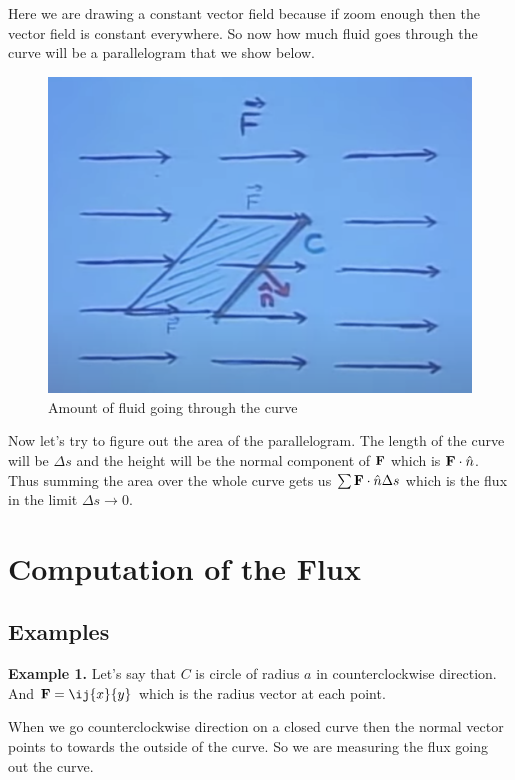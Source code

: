 Here we are drawing a constant vector field because if zoom enough then the vector field is constant everywhere.
So now how much fluid goes through the curve will be a parallelogram that we show below.

\begin{figure}[ht!]
    \centering
    \includegraphics[scale=0.3]{./images/lecture_19_figure_2.png}
    \caption{Amount of fluid going through the curve}
\end{figure}

Now let's try to figure out the area of the parallelogram.
The length of the curve will be $\Delta s$ and the height will be the normal component of ${\bf F}$ which is ${\bf F} \cdot \hat{n}$.
Thus summing the area over the whole curve gets us $\sum {\bf F} \cdot \hat{n} \Delta s$ which is the flux in the limit $\Delta s \to 0$.

\section{Computation of the Flux}

\subsection{Examples}

{\bf Example 1.}  Let's say that $C$ is circle of radius $a$ in counterclockwise direction.
And ${\bf F} = \ij{x}{y}$ which is the radius vector at each point.

When we go counterclockwise direction on a closed curve then the normal vector points to towards the outside of the curve.
So we are measuring the flux going out the curve.


